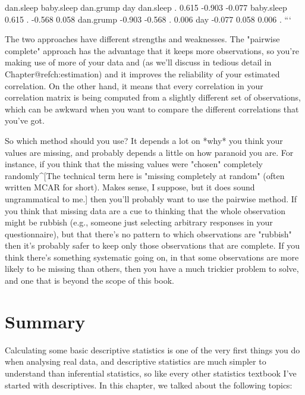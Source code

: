            dan.sleep baby.sleep dan.grump    day
dan.sleep          .      0.615    -0.903 -0.077
baby.sleep     0.615          .    -0.568  0.058
dan.grump     -0.903     -0.568         .  0.006
day           -0.077      0.058     0.006      .
```

The two approaches have different strengths and weaknesses. The "pairwise complete" approach has the advantage that it keeps more observations, so you're making use of more of your data and (as we'll discuss in tedious detail in Chapter@refch:estimation) and it improves the reliability of your estimated correlation. On the other hand, it means that every correlation in your correlation matrix is being computed from a slightly different set of observations, which can be awkward when you want to compare the different correlations that you've got. 
 
So which method should you use? It depends a lot on *why* you think your values are missing, and probably depends a little on how paranoid you are. For instance, if you think that the missing values were "chosen" completely randomly^[The technical term here is "missing completely at random" (often written MCAR for short). Makes sense, I suppose, but it does sound ungrammatical to me.] then you'll probably want to use the pairwise method. If you think that missing data are a cue to thinking that the whole observation might be rubbish (e.g., someone just selecting arbitrary responses in your questionnaire), but that there's no pattern to which observations are "rubbish" then it's probably safer to keep only those observations that are complete. If you think there's something systematic going on, in that some observations are more likely to be missing than others, then you have a much trickier problem to solve, and one that is beyond the scope of this book.

\section{Summary}

Calculating some basic descriptive statistics is one of the very first things you do when analysing real data, and descriptive statistics are much simpler to understand than inferential statistics, so like every other statistics textbook I've started with descriptives. In this chapter, we talked about the following topics:


